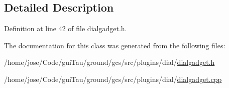 \subsection{Detailed Description}


Definition at line 42 of file dialgadget.\-h.



The documentation for this class was generated from the following files\-:\begin{DoxyCompactItemize}
\item 
/home/jose/\-Code/gui\-Tau/ground/gcs/src/plugins/dial/\hyperlink{dialgadget_8h}{dialgadget.\-h}\item 
/home/jose/\-Code/gui\-Tau/ground/gcs/src/plugins/dial/\hyperlink{dialgadget_8cpp}{dialgadget.\-cpp}\end{DoxyCompactItemize}
